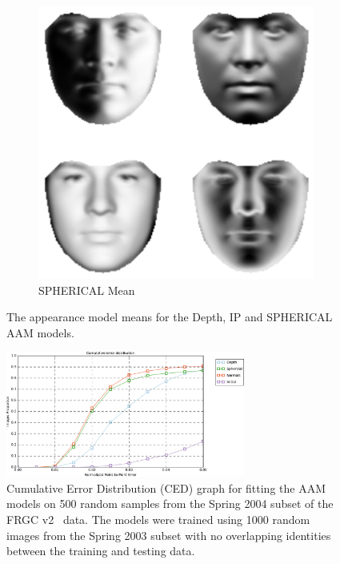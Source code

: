 \begin{figure}[t]
\begin{subfigure}[b]{0.25\textwidth}
        \includegraphics[width=\textwidth]{statistical_normals/images/lk2d/spherical_aam_mean.png}
        \caption{SPHERICAL Mean}\label{subfig:singl_img_spherical_aam_mean}
    \end{subfigure}
    \hspace*{\fill}
    \caption{The appearance model means for the Depth, IP and SPHERICAL 
             AAM models.}
\label{fig:single_img_2d_aam_means}
\end{figure}
\begin{figure}[t]
    \centering
    \includegraphics[width=0.7\textwidth]{statistical_normals/images/lk2d/aam_fgrc_500_random}
    \caption{Cumulative Error Distribution (CED) graph for fitting the AAM
             models on 500 random samples from the Spring 2004 subset of the
             FRGC v2~\cite{phillips2005overview} data. The models were trained
             using 1000 random images from the Spring 2003 subset with no
             overlapping identities between the training and testing data.}
\label{fig:single_img_aam_results}
\end{figure}
